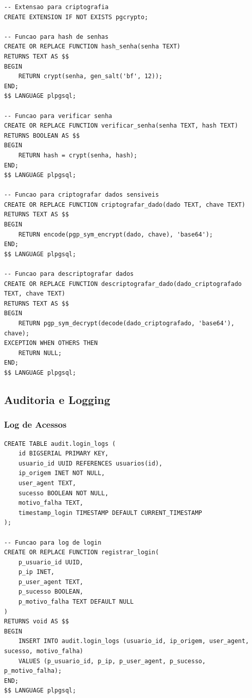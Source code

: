 \begin{lstlisting}[caption=Funcoes para criptografia]
-- Extensao para criptografia
CREATE EXTENSION IF NOT EXISTS pgcrypto;

-- Funcao para hash de senhas
CREATE OR REPLACE FUNCTION hash_senha(senha TEXT)
RETURNS TEXT AS $$
BEGIN
    RETURN crypt(senha, gen_salt('bf', 12));
END;
$$ LANGUAGE plpgsql;

-- Funcao para verificar senha
CREATE OR REPLACE FUNCTION verificar_senha(senha TEXT, hash TEXT)
RETURNS BOOLEAN AS $$
BEGIN
    RETURN hash = crypt(senha, hash);
END;
$$ LANGUAGE plpgsql;

-- Funcao para criptografar dados sensiveis
CREATE OR REPLACE FUNCTION criptografar_dado(dado TEXT, chave TEXT)
RETURNS TEXT AS $$
BEGIN
    RETURN encode(pgp_sym_encrypt(dado, chave), 'base64');
END;
$$ LANGUAGE plpgsql;

-- Funcao para descriptografar dados
CREATE OR REPLACE FUNCTION descriptografar_dado(dado_criptografado TEXT, chave TEXT)
RETURNS TEXT AS $$
BEGIN
    RETURN pgp_sym_decrypt(decode(dado_criptografado, 'base64'), chave);
EXCEPTION WHEN OTHERS THEN
    RETURN NULL;
END;
$$ LANGUAGE plpgsql;
\end{lstlisting}

\subsection{Auditoria e Logging}

\subsubsection{Log de Acessos}

\begin{lstlisting}[caption=Trigger para log de acessos]
CREATE TABLE audit.login_logs (
    id BIGSERIAL PRIMARY KEY,
    usuario_id UUID REFERENCES usuarios(id),
    ip_origem INET NOT NULL,
    user_agent TEXT,
    sucesso BOOLEAN NOT NULL,
    motivo_falha TEXT,
    timestamp_login TIMESTAMP DEFAULT CURRENT_TIMESTAMP
);

-- Funcao para log de login
CREATE OR REPLACE FUNCTION registrar_login(
    p_usuario_id UUID,
    p_ip INET,
    p_user_agent TEXT,
    p_sucesso BOOLEAN,
    p_motivo_falha TEXT DEFAULT NULL
)
RETURNS void AS $$
BEGIN
    INSERT INTO audit.login_logs (usuario_id, ip_origem, user_agent, sucesso, motivo_falha)
    VALUES (p_usuario_id, p_ip, p_user_agent, p_sucesso, p_motivo_falha);
END;
$$ LANGUAGE plpgsql;
\end{lstlisting}

